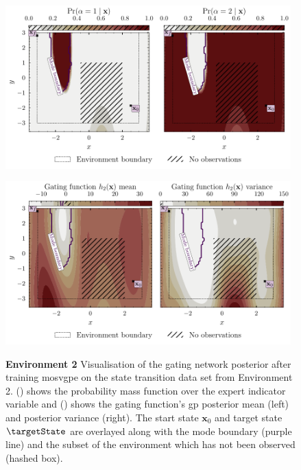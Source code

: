 \documentclass{mimosis-class/mimosis}
\numberwithin{equation}{chapter}
\newcommand{\state}{\ensuremath{\mathbf{x}}}
\begin{document}
{\begin{figure}[h!]
\centering
\begin{minipage}[r]{\columnwidth}
\centering
\includegraphics[width=0.98\textwidth]{./images/mode-opt/env/scenario_5/mosvgpe/mixing_probs_no_obs.pdf}
\label{eq-traj-opt-gating-network-prob-post-5}
\end{minipage}
\begin{minipage}{1.0\textwidth}
\centering
\includegraphics[width=0.98\textwidth]{./images/mode-opt/env/scenario_5/mosvgpe/desired_gating_gp_no_obs.pdf}
\label{eq-traj-opt-gating-network-gp-post-5}
\end{minipage}
\caption[Environment 2 gating network posterior]{\textbf{Environment 2} Visualisation of the gating network posterior after training \acrshort{mosvgpe}
on the state transition data set from Environment 2.
() shows the probability mass function over the expert indicator
variable and () shows the gating function's \acrshort{gp}
posterior mean (left) and posterior variance (right).
The start state $\state_0$ and target state $\targetState$ are overlayed along with the mode boundary (purple line)
and the subset of the environment which has not been observed (hashed box).}
\label{fig-traj-opt-gating-network-5}
\end{figure}
}
\end{document}
